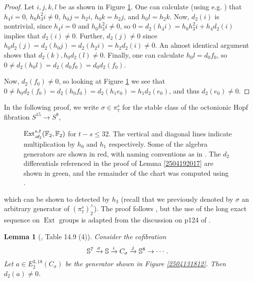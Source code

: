 \documentclass[11pt, titlepage]{article} %
\def\bb{\ensuremath\mathbb}
\def\A{\ensuremath{\mathscr{A}_2}}
\DeclareMathOperator{\Ext}{Ext}
\numberwithin{equation}{subsection}
\theoremstyle{plain}
\newtheorem{lemma}[theorem]{Lemma}
\theoremstyle{definition}
\begin{document}
\begin{proof}
Let \(i, j, k, l\) be as shown in Figure \ref{2504201924}. One can calculate (using e.g. \autocite{ext}) that \(h_4i=0\), \(h_0h_3^2i\neq 0\), \(h_0j=h_2i\), \(h_0k=h_2j\), and \(h_0l=h_2k\). Now, \(d_2(i)\) is nontrivial, since \(h_4i=0\) and \(h_0h_3^2i\neq 0\), so \(0=d_2(h_4i)=h_0h_3^2i+h_4d_2(i)\) implies that \(d_2(i)\neq 0\). Further, \(d_2(j)\neq 0\) since \(h_0d_2(j)=d_2(h_0j)=d_2(h_2i)=h_2d_2(i)\neq 0\). An almost identical argument shows that \(d_2(k), h_0d_2(l)\neq0\). Finally, one can calculate \(h_0l=d_0f_0\), so \(0\neq d_2(h_0l)=d_2(d_0f_0)=d_0d_2(f_0)\).

Now, \(d_2(f_0)\neq 0\), so looking at Figure \ref{2504201924} we see that \(0\neq h_0d_2(f_0)=d_2(h_0f_0)=d_2(h_1e_0)=h_1d_2(e_0)\), and thus \(d_2(e_0)\neq 0\).
\end{proof}
In the following proof, we write \(\sigma\in \pi_7^s\) for the stable class of the octonionic Hopf fibration \(S^{15}\to S^8\),
\begin{landscape}
\begin{figure}
\centering

\caption{\(\Ext^{s,t}_{\A}(\bb{F}_2, \bb{F}_2)\) for \(t-s\leq 32\). The vertical and diagonal lines indicate multiplication by \(h_0\) and \(h_1\) respectively. Some of the algebra generators are shown in red, with naming conventions as in \autocite{rognes2}. The \(d_2\) differentials referenced in the proof of Lemma \ref{2504192017} are shown in green, and the remainder of the chart was computed using \autocite{sseq}.}
\label{2504201924}
\end{figure}
\end{landscape}
which can be shown to detected by \(h_3\) (recall that we previously denoted by \(\sigma\) an arbitrary generator of \((\pi_7^s)^\wedge_2\)). The proof follows \autocite{rognes2}, but the use of the long exact sequence on \(\Ext\) groups is adapted from the discussion on p124 of \autocite{ass}. 

\begin{lemma}[{\autocite{rognes2}, Table 14.9 (4)}]\label{2504131851}
Consider the cofibration
\[\bb{S}^7 \xrightarrow{\sigma} \bb{S} \xrightarrow{i} C_\sigma \xrightarrow{j} \bb{S}^8\to \cdots.\]
Let \(a\in E_2^{3,18}(C_\sigma)\) be the generator shown in Figure \ref{2504131812}. Then \(d_2(a)\neq 0\).
\end{lemma}
\end{document}
